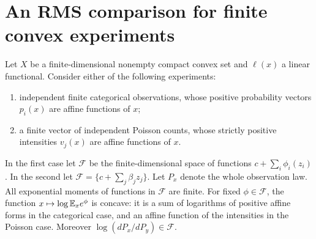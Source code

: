 \section{An RMS comparison for finite convex experiments}
Let $X$ be a finite-dimensional nonempty compact convex set and $\ell(x)$
a linear functional. Consider either of the following experiments:
\begin{enumerate}
\item independent finite categorical observations, whose positive probability
vectors $p_i(x)$ are affine functions of $x$;
\item a finite vector of independent Poisson counts, whose strictly positive
intensities $v_j(x)$ are affine functions of $x$.
\end{enumerate}
In the first case let $\mathcal F$ be the finite-dimensional space of
functions $c+\sum_i\phi_i(z_i)$. In the second let
$\mathcal F=\{c+\sum_j\beta_j z_j\}$. Let $P_x$ denote the whole
observation law. All exponential moments of functions in $\mathcal F$
are finite. For fixed $\phi\in\mathcal F$, the function
$x\mapsto\log\mathbb E_xe^\phi$ is concave: it is a sum of logarithms of positive
affine forms in the categorical case, and an affine function of the
intensities in the Poisson case. Moreover $\log(dP_x/dP_y)\in\mathcal F$.

